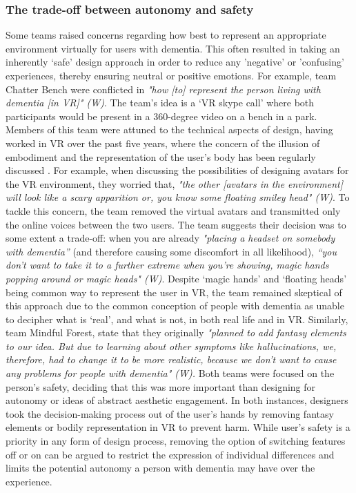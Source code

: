 \subsubsection{The trade-off between autonomy and safety}
\label{ThemeTwo:subthemeTwo}
Some teams raised concerns regarding how best to represent an appropriate environment virtually for users with dementia. This often resulted in taking an inherently ‘safe’ design approach in order to reduce any 'negative' or 'confusing' experiences, thereby ensuring neutral or positive emotions. For example, team Chatter Bench were conflicted in \textit{"how [to] represent the person living with dementia [in VR]" (W)}. The team's idea is a ‘VR skype call' where both participants would be present in a 360-degree video on a bench in a park. Members of this team were attuned to the technical aspects of design, having worked in VR over the past five years, where the concern of the illusion of embodiment and the representation of the user's body has been regularly discussed \citep{nakamura_virtual_2019}. For example, when discussing the possibilities of designing avatars for the VR environment, they worried that, \textit{"the other [avatars in the environment] will look like a scary apparition or, you know some floating smiley head" (W)}. To tackle this concern, the team removed the virtual avatars and transmitted only the online voices between the two users. The team suggests their decision was to some extent a trade-off: when you are already \textit{"placing a headset on somebody with dementia”} (and therefore causing some discomfort in all likelihood), \textit{“you don't want to take it to a further extreme when you're showing, magic hands popping around or magic heads" (W)}. Despite ‘magic hands’ and ‘floating heads’ being common way to represent the user in VR, the team remained skeptical of this approach due to the common conception of people with dementia as unable to decipher what is ‘real’, and what is not, in both real life and in VR. Similarly, team Mindful Forest, state that they originally \textit{"planned to add fantasy elements to our idea. But due to learning about other symptoms like hallucinations, we, therefore, had to change it to be more realistic, because we don't want to cause any problems for people with dementia" (W).} Both teams were focused on the person’s safety, deciding that this was more important than designing for autonomy or ideas of abstract aesthetic engagement. In both instances, designers took the decision-making process out of the user’s hands by removing fantasy elements or bodily representation in VR to prevent harm. While user’s safety is a priority in any form of design process, removing the option of switching features off or on can be argued to restrict the expression of individual differences and limits the potential autonomy a person with dementia may have over the experience.

